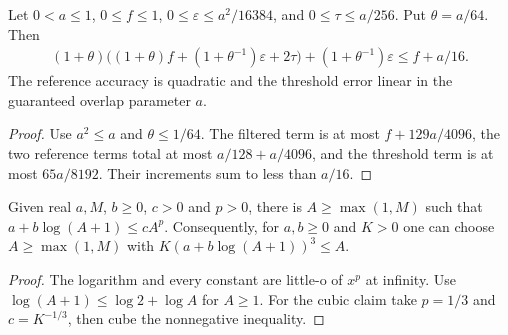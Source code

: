 \begin{lemma}
    \label{lem:interleaved_reference_trim_budget}
    \leanok
    Let $0<a\le1$, $0\le f\le1$, $0\le\varepsilon\le a^2/16384$,
    and $0\le\tau\le a/256$. Put $\theta=a/64$. Then
    \begin{align}
        (1+\theta)\bigl((1+\theta)f+(1+\theta^{-1})\varepsilon+2\tau\bigr)
        +(1+\theta^{-1})\varepsilon\le f+a/16.
        \label{eq:interleaved_trim_budget}
    \end{align}
    The reference accuracy is quadratic and the threshold error linear
    in the guaranteed overlap parameter $a$.
\end{lemma}
\begin{proof}\leanok
    Use $a^2\le a$ and $\theta\le1/64$. The filtered term is at most
    $f+129a/4096$, the two reference terms total at most
    $a/128+a/4096$, and the threshold term is at most $65a/8192$.
    Their increments sum to less than $a/16$.
\end{proof}

\begin{lemma}
    \label{lem:log_rpow_absorption}
    \leanok
    Given real $a,M$, $b\ge0$, $c>0$ and $p>0$, there is $A\ge\max(1,M)$
    such that $a+b\log(A+1)\le cA^p$. Consequently, for $a,b\ge0$ and
    $K>0$ one can choose $A\ge\max(1,M)$ with
    $K(a+b\log(A+1))^3\le A$.
\end{lemma}
\begin{proof}\leanok
    The logarithm and every constant are little-o of $x^p$ at infinity.
    Use $\log(A+1)\le\log2+\log A$ for $A\ge1$. For the cubic claim
    take $p=1/3$ and $c=K^{-1/3}$, then cube the nonnegative inequality.
\end{proof}

